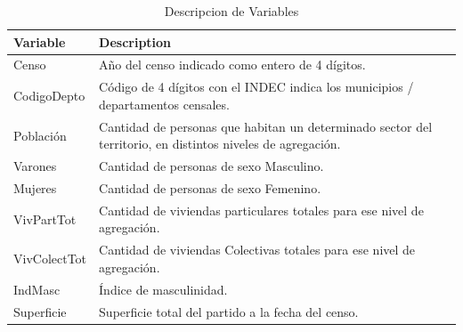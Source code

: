 \documentclass{article}
\theoremstyle{mytheoremstyle}
\theoremstyle{mytheoremstyle}
\theoremstyle{myproblemstyle}
\begin{document}
 \begin{table}[htbp]
     \centering
     \caption{Descripcion de Variables}
     \begin{tabular}{|l|p{8cm}|}
         \hline
         \textbf{Variable} & \textbf{Description} \\
         \hline
         Censo & Año del censo indicado como entero de 4 dígitos. \\
         CodigoDepto & Código de 4 dígitos con el INDEC indica los municipios / departamentos censales. \\
         Población & Cantidad de personas que habitan un determinado sector del territorio, en distintos niveles de agregación. \\
         Varones & Cantidad de personas de sexo Masculino. \\
         Mujeres & Cantidad de personas de sexo Femenino. \\
         VivPartTot & Cantidad de viviendas particulares totales para ese nivel de agregación. \\
         VivColectTot & Cantidad de viviendas Colectivas totales para ese nivel de agregación. \\
         IndMasc & Índice de masculinidad. \\
         Superficie & Superficie total del partido a la fecha del censo. \\
         \hline
     \end{tabular}
     \label{variables}
 \end{table}
\end{document}
